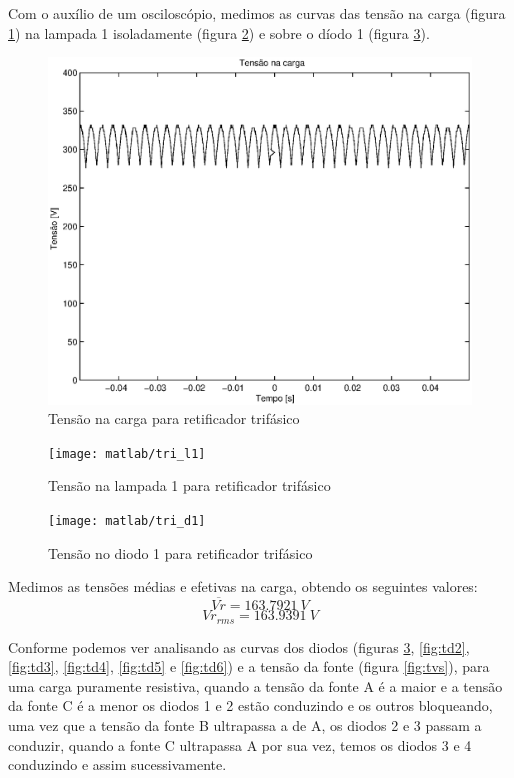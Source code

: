 \documentclass{report}
\begin{document}
{{Com o auxílio de um osciloscópio, medimos as curvas das tensão na carga (figura \ref{fig:tvr}) na lampada 1 isoladamente (figura \ref{fig:tl1}) e sobre o díodo 1 (figura \ref{fig:td1}).
\begin{figure}[H]
	\centering
	\includegraphics[width=0.7\linewidth]{dados/trifasico/tri_r}
	\caption{Tensão na carga para retificador trifásico}
	\label{fig:tvr}
\end{figure}
\begin{figure}[H]
	\centering
	\texttt{[image: matlab/tri\_l1]}
	\caption{Tensão na lampada 1 para retificador trifásico}
	\label{fig:tl1}
\end{figure}
\begin{figure}[H]
	\centering
	\texttt{[image: matlab/tri\_d1]}
	\caption{Tensão no diodo 1 para retificador trifásico}
	\label{fig:td1}
\end{figure}

Medimos as tensões médias e efetivas na carga, obtendo os seguintes valores:
\begin{equation}
\overline{Vr} = 163.7921\ V
\end{equation}
\begin{equation}
Vr_{rms} =  163.9391\ V
\end{equation}

Conforme podemos ver analisando as curvas dos diodos (figuras \ref{fig:td1}, \ref{fig:td2}, \ref{fig:td3}, \ref{fig:td4}, \ref{fig:td5} e \ref{fig:td6}) e a tensão da fonte (figura \ref{fig:tvs}), para uma carga puramente resistiva, quando a tensão da fonte A é a maior e a tensão da fonte C é a menor os diodos 1 e 2 estão conduzindo e os outros bloqueando, uma vez que a tensão da fonte B ultrapassa a de A, os diodos 2 e 3 passam a conduzir, quando a fonte C ultrapassa A por sua vez, temos os diodos 3 e 4 conduzindo e assim sucessivamente.

}}
\end{document}
